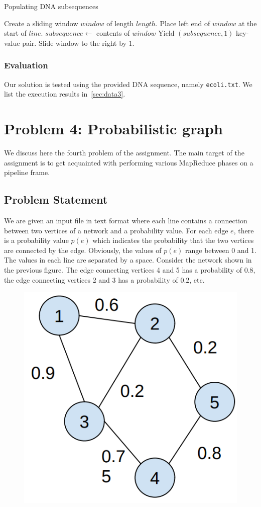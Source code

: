 \documentclass[acmlarge]{acmart}
\begin{document}
\begin{algorithm}[!tb]
  \caption{Populating DNA subsequences}
  \label{algo:subsequences}
  \begin{algorithmic}[1]
    \State Create a sliding window $window$ of length $length$.
    \State Place left end of $window$ at the start of $line$.
    \State $subsequence \gets$ contents of $window$
    \State Yield $(subsequence, 1)$ key-value pair.
    \State Slide window to the right by $1$.
    \EndWhile
    \EndFor
  \end{algorithmic}
\end{algorithm}

\subsubsection{Evaluation} Our solution is tested using the provided DNA sequence, namely \texttt{ecoli.txt}. We list the execution results in~\autoref{sec:data3}.

\section{Problem 4: Probabilistic graph}
\label{sec:problem4}
We discuss here the fourth problem of the assignment.
The main target of the assignment is to get acquainted with performing various MapReduce phases on a pipeline frame.

\subsection{Problem Statement}
We are given an input file in text format where each line contains a connection between two vertices of a network and a
probability value.
For each edge \( e \), there is a probability value \( p(e) \) which indicates the probability that the two vertices are
connected by the edge.
Obviously, the values of \( p(e) \) range between 0 and 1.
The values in each line are separated by a space.
Consider the network shown in the previous figure.
The edge connecting vertices 4 and 5 has a probability of
0.8, the edge connecting vertices 2 and 3 has a probability of 0.2, etc.

\begin{figure}[h]
  \centering
  \includegraphics[width=0.25\linewidth]{figures/graph}
\end{figure}
\end{document}
